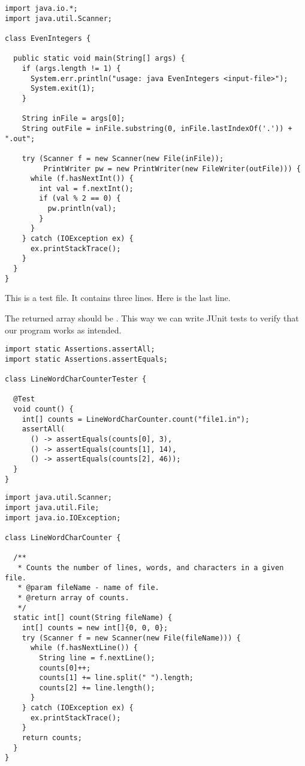 \begin{lstlisting}[language=MyJava]
import java.io.*;
import java.util.Scanner;

class EvenIntegers {

  public static void main(String[] args) {
    if (args.length != 1) {
      System.err.println("usage: java EvenIntegers <input-file>");
      System.exit(1);
    }

    String inFile = args[0];
    String outFile = inFile.substring(0, inFile.lastIndexOf('.')) + ".out";

    try (Scanner f = new Scanner(new File(inFile));
         PrintWriter pw = new PrintWriter(new FileWriter(outFile))) {
      while (f.hasNextInt()) {
        int val = f.nextInt();
        if (val % 2 == 0) { 
          pw.println(val); 
        }
      }
    } catch (IOException ex) { 
      ex.printStackTrace(); 
    }
  }
}
\end{lstlisting}


\begin{verbnobox}[\small]
This is a test file.
It contains three lines.
Here is the last line.
\end{verbnobox}
The returned array should be \ttt{[3, 14, 46]}. This way we can write JUnit tests to verify that our program works as intended.

\begin{lstlisting}[language=MyJava]
import static Assertions.assertAll;
import static Assertions.assertEquals;

class LineWordCharCounterTester {

  @Test
  void count() {
    int[] counts = LineWordCharCounter.count("file1.in");
    assertAll(
      () -> assertEquals(counts[0], 3),
      () -> assertEquals(counts[1], 14),
      () -> assertEquals(counts[2], 46));
  }
}
\end{lstlisting}

\begin{lstlisting}[language=MyJava]
import java.util.Scanner;
import java.util.File;
import java.io.IOException;

class LineWordCharCounter {

  /**
   * Counts the number of lines, words, and characters in a given file.
   * @param fileName - name of file.
   * @return array of counts.
   */
  static int[] count(String fileName) {
    int[] counts = new int[]{0, 0, 0};
    try (Scanner f = new Scanner(new File(fileName))) {
      while (f.hasNextLine()) {
        String line = f.nextLine();
        counts[0]++;
        counts[1] += line.split(" ").length;
        counts[2] += line.length();
      }
    } catch (IOException ex) { 
      ex.printStackTrace(); 
    }
    return counts;
  }
}
\end{lstlisting}


